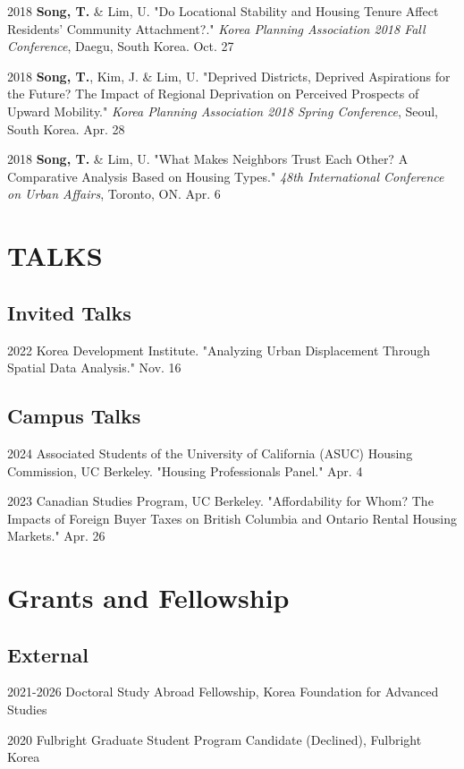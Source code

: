\documentclass[12pt,letterpaper]{report}
\begin{document}
\begin{tablist}
      \item[2018] \tab{}\textbf{Song, T.} \& Lim, U.  "Do Locational Stability and Housing Tenure Affect Residents' Community Attachment?." \emph{Korea Planning Association 2018 Fall Conference}, Daegu, South Korea. Oct. 27 
      \item[2018] \tab{}\textbf{Song, T.}, Kim, J. \& Lim, U. "Deprived Districts, Deprived Aspirations for the Future? The Impact of Regional Deprivation on Perceived Prospects of Upward Mobility." \emph{Korea Planning Association 2018 Spring Conference}, Seoul, South Korea. Apr. 28
        \item[2018] \tab{}\textbf{Song, T.} \& Lim, U. "What Makes Neighbors Trust Each Other? A Comparative Analysis Based on Housing Types." \emph{48th International Conference on Urban Affairs}, Toronto, ON. Apr. 6
    \end{tablist}
    
  \section*{TALKS}
    \subsection*{Invited Talks}
    \begin{tablist}
    \item[2022] \tab{}Korea Development Institute. "Analyzing Urban Displacement Through Spatial Data Analysis." Nov. 16
    \end{tablist}
    \subsection*{Campus Talks}
    \begin{tablist}
        \item[2024] \tab{}Associated Students of the University of California (ASUC) Housing Commission, UC Berkeley. "Housing Professionals Panel." Apr. 4
        \item[2023] \tab{}Canadian Studies Program, UC Berkeley. "Affordability for Whom? The Impacts of Foreign Buyer Taxes on British Columbia and Ontario Rental Housing Markets." Apr. 26
    \end{tablist}

\section*{Grants and Fellowship}
    \subsection*{External}
    \begin{tablist}
        \item[2021-2026] \tab{}Doctoral Study Abroad Fellowship, Korea Foundation for Advanced Studies
        \item[2020] \tab{}Fulbright Graduate Student Program Candidate (Declined), Fulbright Korea
    \end{tablist}
\end{document}
